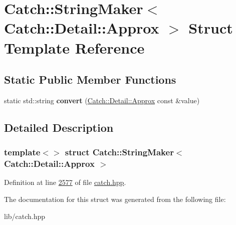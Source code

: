 \hypertarget{structCatch_1_1StringMaker_3_01Catch_1_1Detail_1_1Approx_01_4}{}\section{Catch\+::String\+Maker$<$ Catch\+::Detail\+::Approx $>$ Struct Template Reference}
\label{structCatch_1_1StringMaker_3_01Catch_1_1Detail_1_1Approx_01_4}
\subsection*{Static Public Member Functions}
\begin{DoxyCompactItemize}
\item 
\mbox{\label{structCatch_1_1StringMaker_3_01Catch_1_1Detail_1_1Approx_01_4_a8e5015720682fecfbff0f05de19a698f}} 
static std\+::string {\bfseries convert} (\mbox{\hyperlink{classCatch_1_1Detail_1_1Approx}{Catch\+::\+Detail\+::\+Approx}} const \&value)
\end{DoxyCompactItemize}


\subsection{Detailed Description}
\subsubsection*{template$<$$>$\newline
struct Catch\+::\+String\+Maker$<$ Catch\+::\+Detail\+::\+Approx $>$}



Definition at line \mbox{\hyperlink{catch_8hpp_source_l02577}{2577}} of file \mbox{\hyperlink{catch_8hpp_source}{catch.\+hpp}}.



The documentation for this struct was generated from the following file\+:\begin{DoxyCompactItemize}
\item 
lib/catch.\+hpp\end{DoxyCompactItemize}

